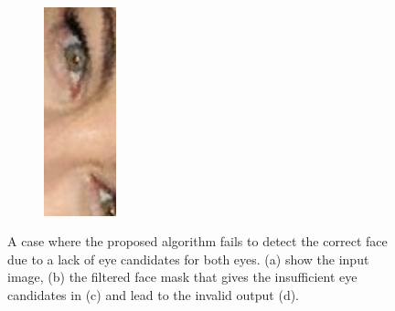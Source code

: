 \begin{figure}[H]
\begin{subfigure}{.25\textwidth}
  \caption{}
\end{subfigure}%
\begin{subfigure}{.25\textwidth}
  \centering
  \includegraphics[width=0.23\textwidth]{img/fd3/fail3_output.png}
  \caption{}
\end{subfigure}%

\caption{A case where the proposed algorithm fails to detect the correct face due to a lack of eye candidates for both eyes. (a) show the input image, (b) the filtered face mask that gives the insufficient eye candidates in (c) and lead to the invalid output (d).}
\label{fig:fail3}
\end{figure}





